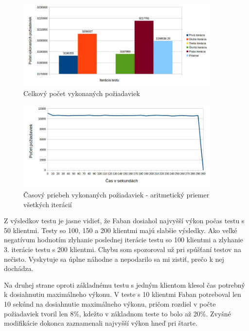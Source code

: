 \documentclass[12pt,oneside,final]{fithesis-utf8}
\begin{document}
\begin{itemize}
\begin{itemize}
\end{itemize}

\begin{figure}[H]
  \centering
      \includegraphics[width=0.9\textwidth]{faban2_5.jpg}
  \caption{Celkový počet vykonaných požiadaviek}
\end{figure}

\begin{figure}[H]
  \centering
      \includegraphics[width=0.9\textwidth]{faban2_5_distr.jpg}
  \caption{Časový priebeh vykonaných požiadaviek - aritmetický priemer všetkých iterácií}
\end{figure}

Z výsledkov testu je jasne vidieť, že Faban dosiahol najvyšší výkon počas testu s 50 klientmi. Testy so 100, 150 a 200 klientmi majú slabšie výsledky. Ako veľké negatívum hodnotím zlyhanie poslednej iterácie testu so 100 klientmi a zlyhanie 3. iterácie testu s 200 klientmi. Chybu som spozoroval už pri spúšťaní testov na nečisto. Vyskytuje sa úplne náhodne a nepodarilo sa mi zistiť, prečo k nej dochádza.
\par Na druhej strane oproti základnému testu s jedným klientom klesol čas potrebný k dosiahnutiu maximálneho výkonu. V teste s 10 klientmi Faban potreboval len 10 sekúnd na dosiahnutie maximálneho výkonu, pričom rozdiel v počte požiadaviek tvoril len 8\%, kdežto v základnom teste to bolo až 20\%. Zvyšné modifikácie dokonca zaznamenali najvyšší výkon hneď pri štarte.




\end{itemize}
\end{document}
